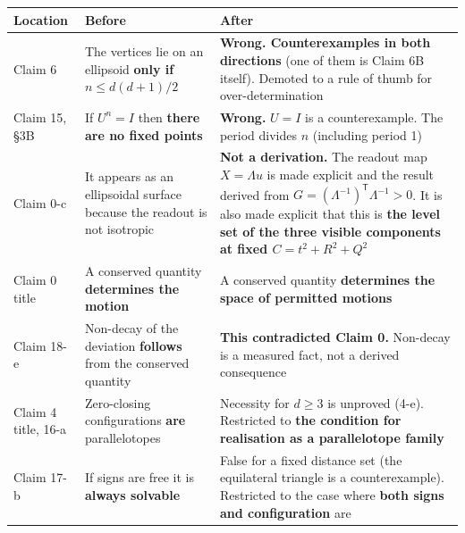 \documentclass[
  10pt,
]{article}
\newcounter{none} %
\begin{document}
{\def\LTcaptype{none} %
\begin{longtable}[]{@{}
  >{\raggedright\arraybackslash}p{}
  >{\raggedright\arraybackslash}p{}
  >{\raggedright\arraybackslash}p{}@{}}
\toprule\noalign{}
\begin{minipage}[b]{\linewidth}\raggedright
Location
\end{minipage} & \begin{minipage}[b]{\linewidth}\raggedright
Before
\end{minipage} & \begin{minipage}[b]{\linewidth}\raggedright
After
\end{minipage} \\
\midrule\noalign{}
\endhead
\bottomrule\noalign{}
\endlastfoot
Claim 6 & The vertices lie on an ellipsoid \textbf{only if}
\(n\le d(d+1)/2\) & \textbf{Wrong. Counterexamples in both directions}
(one of them is Claim 6B itself). Demoted to a rule of thumb for
over-determination \\
Claim 15, §3B & If \(U^n=I\) then \textbf{there are no fixed points} &
\textbf{Wrong.} \(U=I\) is a counterexample. The period divides \(n\)
(including period 1) \\
Claim 0-c & It appears as an ellipsoidal surface because the readout is
not isotropic & \textbf{Not a derivation.} The readout map
\(X=\Lambda u\) is made explicit and the result derived from
\(G=(\Lambda^{-1})^{\mathsf T}\Lambda^{-1}>0\). It is also made explicit
that this is \textbf{the level set of the three visible components at
fixed \(C=t^2+R^2+Q^2\)} \\
Claim 0 title & A conserved quantity \textbf{determines the motion} & A
conserved quantity \textbf{determines the space of permitted motions} \\
Claim 18-e & Non-decay of the deviation \textbf{follows} from the
conserved quantity & \textbf{This contradicted Claim 0.} Non-decay is a
measured fact, not a derived consequence \\
Claim 4 title, 16-a & Zero-closing configurations \textbf{are}
parallelotopes & Necessity for \(d\ge3\) is unproved (4-e). Restricted
to \textbf{the condition for realisation as a parallelotope family} \\
Claim 17-b & If signs are free it is \textbf{always solvable} & False
for a fixed distance set (the equilateral triangle is a counterexample).
Restricted to the case where \textbf{both signs and configuration} are

\end{longtable}}
\end{document}
